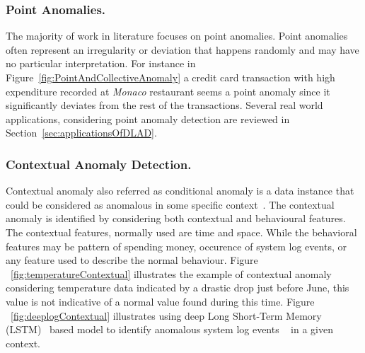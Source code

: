 \subsubsection{Point Anomalies.}
The majority of work in literature focuses on point anomalies. Point anomalies often represent an irregularity or deviation that happens randomly and may have no particular interpretation. For instance in Figure~\ref{fig:PointAndCollectiveAnomaly} a credit card transaction with high expenditure recorded at
\textit{Monaco} restaurant seems a point anomaly since it significantly deviates from the rest of the transactions. Several real world applications, considering point anomaly detection are reviewed in Section~\ref{sec:applicationsOfDLAD}.

\subsubsection{Contextual Anomaly Detection.}
\label{sec:contextualanomalies}
Contextual anomaly also referred as conditional anomaly is a data instance that could be considered as anomalous in some specific context~\cite{song2007conditional}. The contextual anomaly is identified by considering both contextual and behavioural features.
The contextual features, normally used are time and space. While the behavioral features may be pattern of spending money, occurence of system log events, or any feature used to describe the normal behaviour.
Figure ~\ref{fig:temperatureContextual} illustrates the example of contextual anomaly considering temperature data indicated by a drastic drop just before June, this value is not indicative of a normal value found during this time. Figure ~\ref{fig:deeplogContextual} illustrates using deep Long Short-Term Memory (LSTM)~\cite{hochreiter1997long}  based model to identify anomalous system log events ~\cite{du2017deeplog} in a given context.

